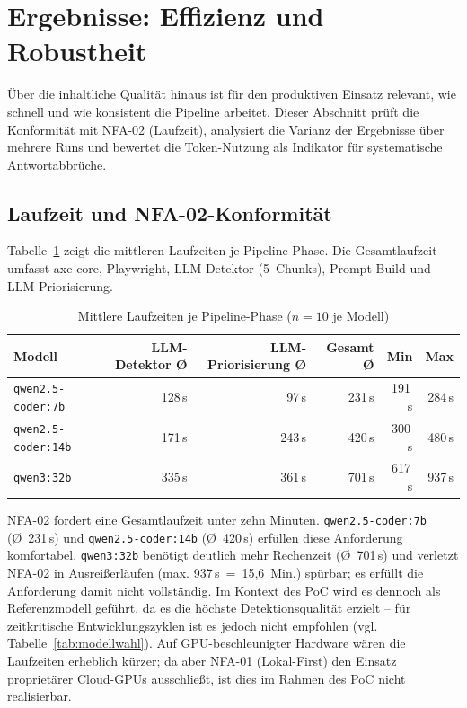 \section{Ergebnisse: Effizienz und Robustheit}
\label{sec:ergebnisse_effizienz}

Über die inhaltliche Qualität hinaus ist für den produktiven Einsatz relevant, wie schnell und wie konsistent die Pipeline arbeitet. Dieser Abschnitt prüft die Konformität mit \ac{NFA}-02 (Laufzeit), analysiert die Varianz der Ergebnisse über mehrere Runs und bewertet die Token-Nutzung als Indikator für systematische Antwortabbrüche.

\subsection{Laufzeit und NFA-02-Konformität}
\label{sec:effizienz_laufzeit}

Tabelle~\ref{tab:laufzeit_modelle} zeigt die mittleren Laufzeiten je Pipeline-Phase. Die Gesamtlaufzeit umfasst axe-core, Playwright, \ac{LLM}-Detektor (5~Chunks), Prompt-Build und \ac{LLM}-Priorisierung.

\begin{table}[htbp]
\centering
\small
\renewcommand{\arraystretch}{1.15}
\begin{tabular}{@{}lrrrrr@{}}
\toprule
\textbf{Modell} & \textbf{\ac{LLM}-Detektor Ø} & \textbf{\ac{LLM}-Priorisierung Ø} & \textbf{Gesamt Ø} & \textbf{Min} & \textbf{Max} \\
\midrule
\texttt{qwen2.5-coder:7b}  & 128\,s  & 97\,s  & 231\,s & 191\,s & 284\,s \\
\texttt{qwen2.5-coder:14b} & 171\,s & 243\,s & 420\,s & 300\,s & 480\,s \\
\texttt{qwen3:32b}         & 335\,s & 361\,s & 701\,s & 617\,s & 937\,s \\
\bottomrule
\end{tabular}
\caption{Mittlere Laufzeiten je Pipeline-Phase ($n = 10$ je Modell)}
\label{tab:laufzeit_modelle}
\end{table}

\ac{NFA}-02 fordert eine Gesamtlaufzeit unter zehn Minuten. \texttt{qwen2.5-coder:7b} (Ø~231\,s) und \texttt{qwen2.5-coder:14b} (Ø~420\,s) erfüllen diese Anforderung komfortabel. \texttt{qwen3:32b} benötigt deutlich mehr Rechenzeit (Ø~701\,s) und verletzt \ac{NFA}-02 in Ausreißerläufen (max. 937\,s~=~15,6~Min.) spürbar; es erfüllt die Anforderung damit nicht vollständig. Im Kontext des \ac{PoC} wird es dennoch als Referenzmodell geführt, da es die höchste Detektionsqualität erzielt -- für zeitkritische Entwicklungszyklen ist es jedoch nicht empfohlen (vgl. Tabelle~\ref{tab:modellwahl}). Auf \ac{GPU}-beschleunigter Hardware wären die Laufzeiten erheblich kürzer; da aber \ac{NFA}-01 (Lokal-First) den Einsatz proprietärer Cloud-\ac{GPU}s ausschließt, ist dies im Rahmen des \ac{PoC} nicht realisierbar.

